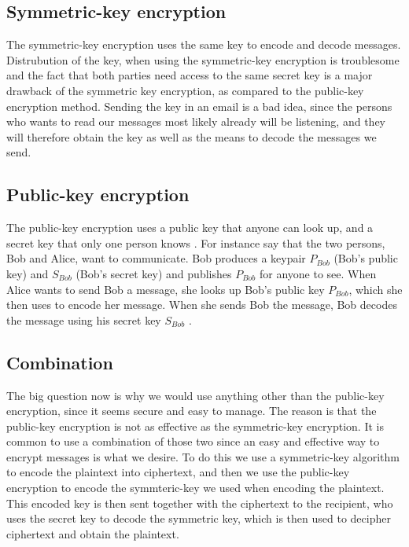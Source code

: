 \subsection{Symmetric-key encryption}
The symmetric-key encryption uses the same key to encode and decode messages. 
Distrubution of the key, when using the symmetric-key encryption is troublesome 
and the fact that both parties need access to the same secret key is a major 
drawback of the symmetric key encryption, as compared to the public-key 
encryption method. Sending the key in an email is a bad idea, since the persons 
who wants to read our messages  most likely already will be listening, and they 
will therefore obtain the key as well as the means to decode the messages we 
send.

\subsection{Public-key encryption}
The public-key encryption uses a public key that anyone can look up, and a 
secret key that only one person knows \citep[pp. 25--32]{Simmons:1992}.
For instance say that the two persons, Bob and Alice, want to communicate. 
Bob produces a keypair \(P_{Bob}\) (Bob’s public key) and \(S_{Bob}\) 
(Bob’s secret key) and publishes \(P_{Bob}\) for anyone to see. When Alice wants 
to send Bob a message, she looks up Bob’s public key \(P_{Bob}\), which she then 
uses to encode her message. When she sends Bob the message, Bob decodes the 
message using his secret key \(S_{Bob}\) \citep{Schneier:2003}.

\subsection{Combination}
The big question now is why we would use anything other than the public-key
encryption, since it seems secure and easy to manage. The reason is that the 
public-key encryption is not as effective as the symmetric-key encryption. 
It is common to use a combination of those two since an easy and effective way 
to encrypt messages is what we desire. To do this we use a symmetric-key 
algorithm to encode the plaintext into ciphertext, and then we use the 
public-key encryption to encode the symmteric-key we used when encoding the 
plaintext. This encoded key is then sent together with the ciphertext to the 
recipient, who uses the secret key to decode the symmetric key, which is then used to decipher ciphertext and obtain the plaintext.

